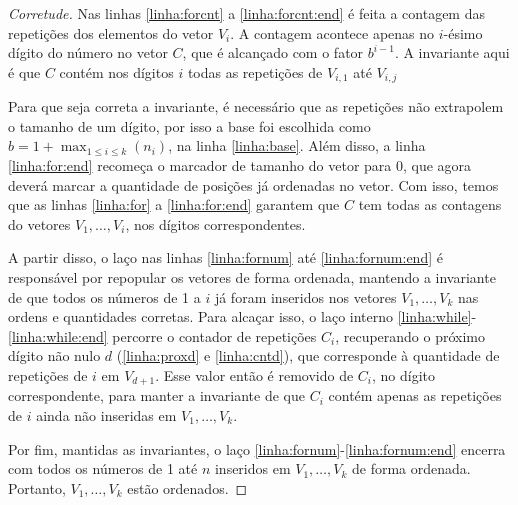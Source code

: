 \begin{proof}[Corretude]
    Nas linhas \ref{linha:forcnt} a \ref{linha:forcnt:end} é feita a contagem das repetições dos elementos do vetor $V_i$. A contagem acontece apenas no $i$-ésimo dígito do número no vetor $C$, que é alcançado com o fator $b^{i-1}$. A invariante aqui é que $C$ contém nos dígitos $i$ todas as repetições de $V_{i,1}$ até $V_{i,j}$

    Para que seja correta a invariante, é necessário que as repetições não extrapolem o tamanho de um dígito, por isso a base foi escolhida como $\displaystyle b = 1 + \max_{1 \leq i \leq k}(n_i)$, na linha \ref{linha:base}. Além disso, a linha \ref{linha:for:end} recomeça o marcador de tamanho do vetor para 0, que agora deverá marcar a quantidade de posições já ordenadas no vetor. Com isso, temos que as linhas \ref{linha:for} a \ref{linha:for:end} garantem que $C$ tem todas as contagens do vetores $V_1, \ldots, V_i$, nos dígitos correspondentes.

    A partir disso, o laço nas linhas \ref{linha:fornum} até \ref{linha:fornum:end} é responsável por repopular os vetores de forma ordenada, mantendo a invariante de que todos os números de 1 a $i$ já foram inseridos nos vetores $V_1, \ldots, V_k$ nas ordens e quantidades corretas. Para alcaçar isso, o laço interno \ref{linha:while}-\ref{linha:while:end} percorre o contador de repetições $C_i$, recuperando o próximo dígito não nulo $d$ (\ref{linha:proxd} e \ref{linha:cntd}), que corresponde à quantidade de repetições de $i$ em $V_{d+1}$. Esse valor então é removido de $C_i$, no dígito correspondente, para manter a invariante de que $C_i$ contém apenas as repetições de $i$ ainda não inseridas em $V_1, \ldots, V_k$.

    Por fim, mantidas as invariantes, o laço \ref{linha:fornum}-\ref{linha:fornum:end} encerra com todos os números de 1 até $n$ inseridos em $V_1, \ldots, V_k$ de forma ordenada. Portanto, $V_1, \ldots, V_k$ estão ordenados.
\end{proof}

